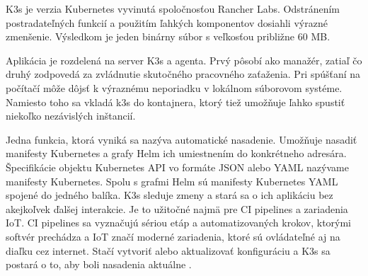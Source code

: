 K3s je verzia Kubernetes vyvinutá spoločnosťou Rancher Labs. Odstránením postradateľných funkcií a použitím ľahkých komponentov dosiahli výrazné zmenšenie. Výsledkom je jeden binárny súbor s veľkosťou približne 60 MB.

Aplikácia je rozdelená na server K3s a agenta. Prvý pôsobí ako manažér, zatiaľ čo druhý zodpovedá za zvládnutie skutočného pracovného zaťaženia. Pri spúšťaní na počítačí môže dôjsť k výraznému neporiadku v lokálnom súborovom systéme. Namiesto toho sa vkladá k3s do kontajnera, ktorý tiež umožňuje ľahko spustiť niekoľko nezávislých inštancií.

Jedna funkcia, ktorá vyniká sa nazýva automatické nasadenie. Umožňuje nasadiť manifesty Kubernetes a grafy Helm ich umiestnením do konkrétneho adresára. Špecifikácie objektu Kubernetes API vo formáte JSON alebo YAML nazývame manifesty Kubernetes. Spolu s grafmi Helm sú manifesty Kubernetes YAML spojené do jedného balíka. K3s sleduje zmeny a stará sa o ich aplikáciu bez akejkoľvek ďalšej interakcie. Je to užitočné najmä pre CI pipelines a zariadenia IoT. CI pipelines sa vyznačujú sériou etáp a automatizovaných krokov, ktorými softvér prechádza a IoT značí moderné zariadenia, ktoré sú ovládateľné aj na diaľku cez internet. Stačí vytvoriť alebo aktualizovať konfiguráciu a K3s sa postará o to, aby boli nasadenia aktuálne \cite{k3s}.

